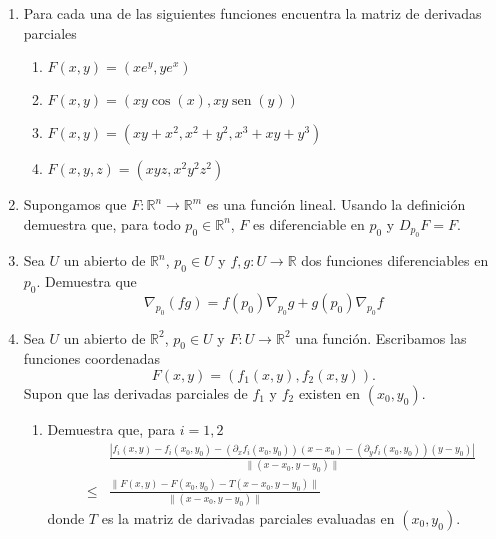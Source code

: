 \documentclass{article}
\newtheorem{definicion}{Definici\'on}
\theoremstyle{definition}
\newcommand{\sen}{\operatorname{sen}}
\begin{document}
\begin{enumerate}
        

                \begin{definicion}
          Sea $U$ un abierto de $\mathbb{R}^n$ y $F:U \to \mathbb{R}^m$ una funci\'on.
          Escribe las funciones coordenadas de $F$ como $F(p)=(f_1(p), \dots, f_m(p))$,
          donde cada $f_i$ es una funci\'on que toma valores en $\mathbb{R}$. Supon que
          todas las derivadas parciales de todas la $f_i$ existen. La matriz de derivadas
          parciales es la matriz de $m\times n$ cuya entrada $(i,j)$ es $\partial_{p_j}f_i$.
        \end{definicion}

      \item Para cada una de las siguientes funciones encuentra la matriz de derivadas
        parciales

        \begin{enumerate}
        \item $F(x,y)=(xe^y, ye^x)$
        \item $F(x,y)=(xy\cos(x), xy\sen(y))$
        \item $F(x,y)=(xy+x^2,x^2+y^2, x^3+xy+y^3)$
        \item $F(x,y,z)=(xyz, x^2y^2z^2)$
        \end{enumerate}


        
      \item Supongamos que  $F:\mathbb{R}^n \to \mathbb{R}^m$ es una funci\'on lineal.
        Usando la definici\'on demuestra que, para todo $p_0\in \mathbb{R}^n$, $F$ es
        diferenciable en $p_0$ y $D_{p_0}F=F$.


      \item Sea $U$ un abierto de $\mathbb{R}^n$, $p_0\in U$  y $f,g:U \to \mathbb{R}$ dos funciones diferenciables en 
         $p_0$. Demuestra que
        $$
        \nabla_{p_0}(fg)=f(p_0)\nabla_{p_0}g + g(p_0)\nabla_{p_0}f  
        $$




          \item Sea $U$ un abierto de $\mathbb{R}^2$, $p_0\in U$
            y $F:U \to \mathbb{R}^2$ una funci\'on. Escribamos
            las funciones coordenadas
            $$
            F(x,y)=(f_1(x,y), f_2(x,y)).
            $$
            Supon que las derivadas parciales de  $f_1$ y
            $f_2$ existen en $(x_0,y_0)$.
            \begin{enumerate}
            \item Demuestra que, para $i=1,2$
              \begin{eqnarray*}
                & & \frac{|f_i(x,y)-f_i(x_0,y_0)-(\partial_xf_i(x_0,y_0))(x-x_0)-
                (\partial_yf_i(x_0,y_0))(y-y_0)|}{\|(x-x_0,y-y_0)\|} \\
              &\leq &
              \frac{\|F(x,y)-F(x_0,y_0)-T(x-x_0,y-y_0) \|}{\|(x-x_0,y-y_0)\|}
              \end{eqnarray*}
            donde $T$ es la matriz de darivadas parciales evaluadas
            en $(x_0,y_0)$.


\end{enumerate}
\end{enumerate}
\end{document}

